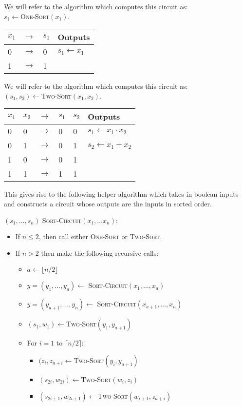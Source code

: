 \documentclass[12pt]{article}
\begin{document}
\begin{enumerate}
We will refer to the algorithm which computes this circuit as:\\
$s_1 \gets$\textsc{One-Sort}$(x_1)$.
\begin{tabular}{|lll|l|}
\hline
$x_1$ & $\rightarrow$ & $s_1$ & Outputs\\
\hline
0 & $\rightarrow$ & 0 & $s_1 \gets x_1$ \\
1 & $\rightarrow$ & 1 &\\
\hline
\end{tabular}

We will refer to the algorithm which computes this circuit as:\\
$(s_1,s_2) \gets$\textsc{Two-Sort}$(x_1,x_2)$.
\begin{tabular}{|lllll|l|}
\hline
$x_1$ & $x_2$ & $\rightarrow$ & $s_1$ & $s_2$ & Outputs\\
\hline
0 & 0 & $\rightarrow$ & 0 & 0 & $s_1 \gets x_1\cdot x_2$ \\
0 & 1 & $\rightarrow$ & 0 & 1 & $s_2 \gets x_1 + x_2$\\
1 & 0 & $\rightarrow$ & 0 & 1 &\\
1 & 1 & $\rightarrow$ & 1 & 1 &\\
\hline
\end{tabular}

This gives rise to the following helper
algorithm which takes in boolean inputs and constructs a
circuit whose outputs are the inputs in sorted order.

$(s_1,\ldots, s_n)$
\textsc{Sort-Circuit}$(x_1,\ldots x_n)$:
\begin{itemize}
\item If $n \le 2$, then call either \textsc{One-Sort} or \textsc{Two-Sort}.
\item If $n > 2$ then make the following recursive calls:
\begin{itemize}
\item $a \gets \lfloor n/2 \rfloor$
\item $y = (y_1, \ldots, y_{a}) \gets$
\textsc{Sort-Circuit}$(x_1, \ldots, x_a)$
\item $y = (y_{a+1}, \ldots, y_{n}) \gets$
\textsc{Sort-Circuit}$(x_{a+1}, \ldots, x_n)$
\item $(s_1,w_1) \gets$\textsc{Two-Sort}$(y_1,y_{a+1})$
\item For $i=1$ to $\lceil n/2 \rceil$:
\begin{itemize}
\item $(z_{i}, z_{a+i} \gets$\textsc{Two-Sort}$(y_{i},y_{a+1})$
\item $(s_{2i}, w_{2i}) \gets $\textsc{Two-Sort}$(w_{i},z_{i})$
\item $(s_{2i+1}, w_{2i+1}) \gets $\textsc{Two-Sort}$(w_{i+1},z_{a+i})$
\end{itemize}
\end{itemize}
\end{itemize}


\end{enumerate}
\end{document}

